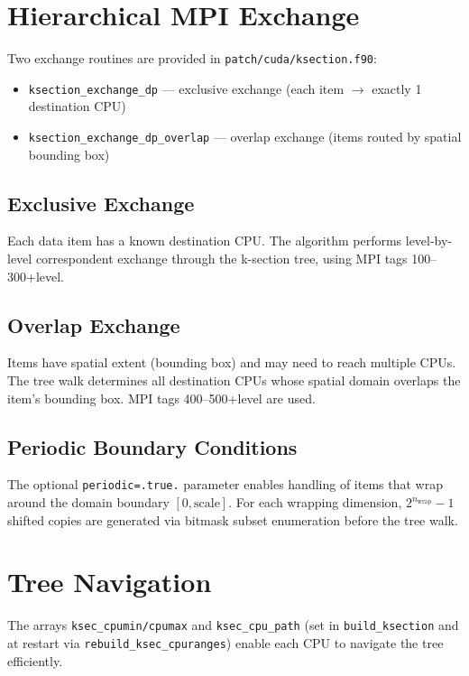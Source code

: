 \documentclass[11pt,fleqn]{book}
\begin{document}
\section{Hierarchical MPI Exchange}

Two exchange routines are provided in \texttt{patch/cuda/ksection.f90}:

\begin{itemize}[leftmargin=2em]
  \item \texttt{ksection\_exchange\_dp} --- exclusive exchange (each item $\to$ exactly 1 destination CPU)
  \item \texttt{ksection\_exchange\_dp\_overlap} --- overlap exchange (items routed by spatial bounding box)
\end{itemize}

\subsection{Exclusive Exchange}

Each data item has a known destination CPU. The algorithm performs level-by-level correspondent exchange through the k-section tree, using MPI tags 100--300+level.

\subsection{Overlap Exchange}

Items have spatial extent (bounding box) and may need to reach multiple CPUs. The tree walk determines all destination CPUs whose spatial domain overlaps the item's bounding box. MPI tags 400--500+level are used.

\subsection{Periodic Boundary Conditions}

The optional \texttt{periodic=.true.} parameter enables handling of items that wrap around the domain boundary $[0, \text{scale}]$. For each wrapping dimension, $2^{n_{\text{wrap}}}-1$ shifted copies are generated via bitmask subset enumeration before the tree walk.

\section{Tree Navigation}

The arrays \texttt{ksec\_cpumin/cpumax} and \texttt{ksec\_cpu\_path} (set in \texttt{build\_ksection} and at restart via \texttt{rebuild\_ksec\_cpuranges}) enable each CPU to navigate the tree efficiently.
\end{document}
